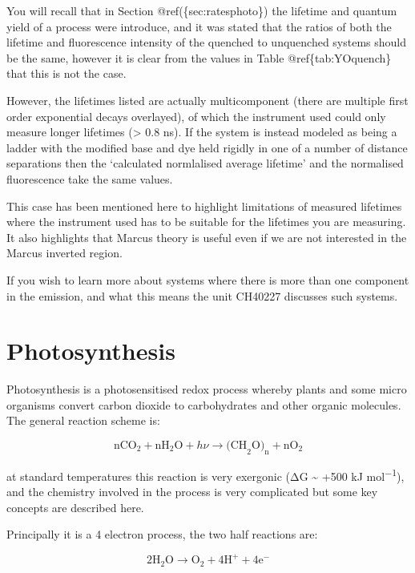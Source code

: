 \documentclass[
]{book}
\begin{document}
You will recall that in Section @ref(\{sec:ratesphoto\}) the lifetime and quantum yield of a process were introduce, and it was stated that the ratios of both the lifetime and fluorescence intensity of the quenched to unquenched systems should be the same, however it is clear from the values in Table @ref\{tab:YOquench\} that this is not the case.

However, the lifetimes listed are actually multicomponent (there are multiple first order exponential decays overlayed), of which the instrument used could only measure longer lifetimes (\textgreater{} 0.8 ns). If the system is instead modeled as being a ladder with the modified base and dye held rigidly in one of a number of distance separations then the `calculated normlalised average lifetime' and the normalised fluorescence take the same values.

This case has been mentioned here to highlight limitations of measured lifetimes where the instrument used has to be suitable for the lifetimes you are measuring. It also highlights that Marcus theory is useful even if we are not interested in the Marcus inverted region.

If you wish to learn more about systems where there is more than one component in the emission, and what this means the unit CH40227 discusses such systems.

\hypertarget{sec:photosyn}{%
\section{Photosynthesis}\label{sec:photosyn}}

Photosynthesis is a photosensitised redox process whereby plants and some micro organisms convert carbon dioxide to carbohydrates and other organic molecules. The general reaction scheme is:

\begin{equation}
\textrm{nCO}_2+ \textrm{nH}_2\textrm{O} + h \nu \longrightarrow \textrm{(CH}_2 \textrm{O)}_\textrm{n}+ \textrm{nO}_2
\label{eq:photosyn}
\end{equation}

at standard temperatures this reaction is very exergonic (ΔG \textasciitilde{} +500 kJ mol\textsuperscript{−1}), and the chemistry involved in the process is very complicated but some key concepts are described here.

Principally it is a 4 electron process, the two half reactions are:

\begin{equation}
2\textrm{H}_2\textrm{O} \longrightarrow \textrm{O}_2 + 4\textrm{H}^+ + 4\textrm{e}^-
\label{eq:photosynhalf1}
\end{equation}
\end{document}

